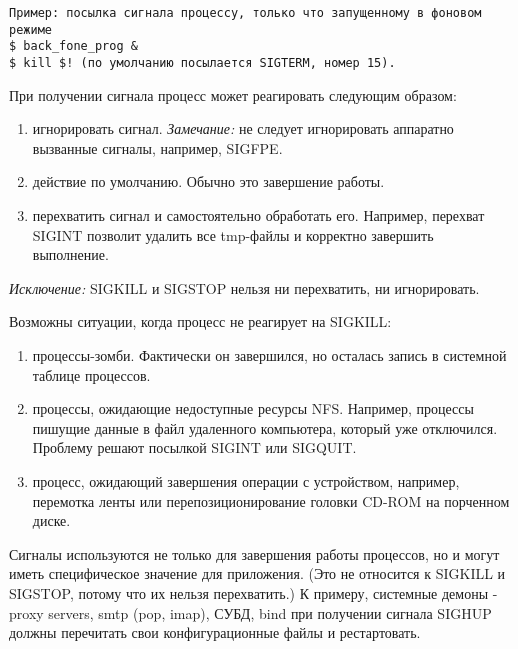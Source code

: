 \begin{verbatim}
Пример: посылка сигнала процессу, только что запущенному в фоновом режиме
$ back_fone_prog &
$ kill $! (по умолчанию посылается SIGTERM, номер 15).
\end{verbatim}

При получении сигнала процесс может реагировать следующим образом:
\begin{enumerate}
\item игнорировать сигнал.\newline
	\emph{Замечание:} не следует игнорировать аппаратно вызванные сигналы, например, SIGFPE.
\item действие по умолчанию. Обычно это завершение работы.
\item перехватить сигнал и самостоятельно обработать его. Например, перехват SIGINT позволит удалить все tmp-файлы и корректно завершить выполнение.
\end{enumerate}

\emph{Исключение:} SIGKILL и SIGSTOP нельзя ни перехватить, ни игнорировать.

Возможны ситуации, когда процесс не реагирует на SIGKILL:
\begin{enumerate}
\item процессы-зомби. Фактически он завершился, но осталась запись в системной таблице процессов.
\item процессы, ожидающие недоступные ресурсы NFS. Например, процессы пишущие данные в файл удаленного компьютера, который уже отключился. Проблему решают посылкой SIGINT или SIGQUIT. 
\item процесс, ожидающий завершения операции с устройством, например, перемотка ленты или перепозиционирование головки CD-ROM на порченном диске.
\end{enumerate}

Сигналы используются не только для завершения работы процессов, но и могут иметь специфическое значение для приложения. (Это не относится к SIGKILL и SIGSTOP, потому что их нельзя перехватить.)
К примеру, системные демоны - proxy servers, smtp (pop, imap), СУБД, bind при получении сигнала SIGHUP должны перечитать свои конфигурационные файлы и рестартовать. 
